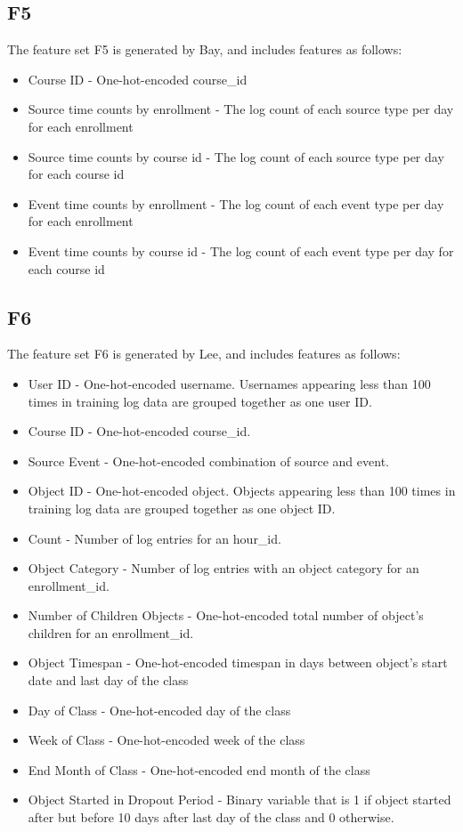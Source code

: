 \subsection{F5}
The feature set F5 is generated by Bay, and includes features as follows:
\begin{itemize}
  \setlength\itemsep{0em}
  \item Course ID - One-hot-encoded course\_id
  \item Source time counts  by enrollment - The log count of each source type per day for each enrollment
  \item Source time counts by course id - The log count of each source type per day for each course id
  \item Event time counts by enrollment - The log count of each event type per day for each enrollment
  \item Event time counts by course id - The log count of each event type per day for each course id

\end{itemize}

\subsection{F6}
The feature set F6 is generated by Lee, and includes features as follows:

\begin{itemize}
  \setlength\itemsep{0em}
  \item User ID - One-hot-encoded username. Usernames appearing less than 100 times in training log data are grouped together as one user ID. 
  \item Course ID - One-hot-encoded course\_id.
  \item Source Event - One-hot-encoded combination of source and event.
  \item Object ID - One-hot-encoded object.  Objects appearing less than 100 times in training log data are grouped together as one object ID.
  \item Count - Number of log entries for an hour\_id.
  \item Object Category - Number of log entries with an object category for an enrollment\_id.
  \item Number of Children Objects - One-hot-encoded total number of object's children for an enrollment\_id.
  \item Object Timespan - One-hot-encoded timespan in days between object's start date and last day of the class
  \item Day of Class - One-hot-encoded day of the class
  \item Week of Class - One-hot-encoded week of the class
  \item End Month of Class - One-hot-encoded end month of the class
  \item Object Started in Dropout Period - Binary variable that is 1 if object started after but before 10 days after last day of the class and 0 otherwise.
\end{itemize}

